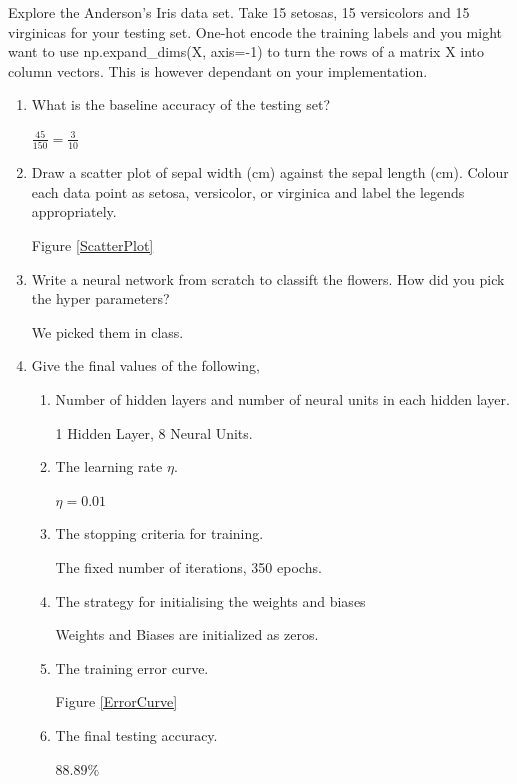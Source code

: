 \documentclass{homework}
\begin{document}
\question Explore the Anderson's Iris data set. Take 15 setosas, 15 versicolors and 15 virginicas for your testing set. One-hot encode the training labels and you might want to use np.expand\_dims(X, axis=-1) to turn the rows of a matrix X into column vectors. This is however dependant on your implementation. 
\begin{enumerate}[label=(\arabic*)]
	\item What is the baseline accuracy of the testing set?

	\begin{sol}
		$\frac{45}{150} = \frac{3}{10}$	
	\end{sol}
	\item Draw a scatter plot of sepal width (cm) against the sepal length (cm). Colour each data point as setosa, versicolor, or virginica and label the legends appropriately.

	\begin{sol}
		Figure \ref{ScatterPlot}
	\end{sol}
	\item Write a neural network from scratch to classift the flowers. How did you pick the hyper parameters? 

	\begin{sol}
		We picked them in class.
	\end{sol}
	\item Give the final values of the following, 
	\begin{enumerate}
		\item Number of hidden layers and number of neural units in each hidden layer.

		\begin{sol}
			1 Hidden Layer, 8 Neural Units.
		\end{sol}	
		\item The learning rate $\eta$.

		\begin{sol}
			$\eta = 0.01$
		\end{sol}
		\item The stopping criteria for training.

		\begin{sol}
			The fixed number of iterations, 350 epochs.
		\end{sol}
		\item The strategy for initialising the weights and biases

		\begin{sol}
			Weights and Biases are initialized as zeros.
		\end{sol}
		\item The training error curve.

		\begin{sol}
			Figure \ref{ErrorCurve}
		\end{sol}
		\item The final testing accuracy.

		\begin{sol}
			$88.89\%$
		\end{sol}
	\end{enumerate}
\end{enumerate}
\end{document}
